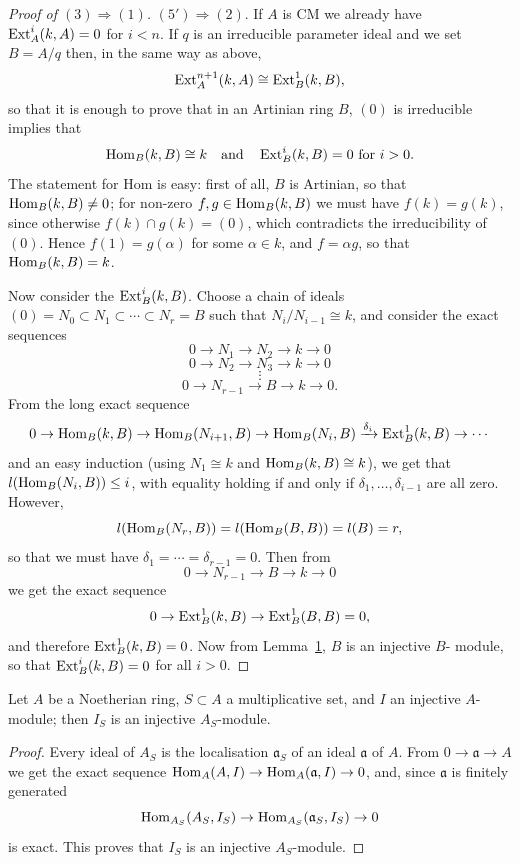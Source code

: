 \begin{proof}[Proof of $(3) \Rightarrow (1)$]
$(5') \Rightarrow (2)$. If $A$ is CM we already have $\operatorname{Ext}^i_A(k, A) = 0$ for $i < n$. If $q$ is
an irreducible parameter ideal and we set $B = A/q$ then, in the same way as
above,
\[
  \operatorname{Ext}^{n+1}_A(k, A) \cong \operatorname{Ext}^1_B(k, B),
\]
so that it is enough to prove that in an Artinian ring $B$, $(0)$ is irreducible
implies that
\[
  \operatorname{Hom}_B(k, B) \cong k \quad \text{and} \quad \operatorname{Ext}^i_B(k, B) = 0 \text{ for } i > 0.
\]
The statement for Hom is easy: first of all, $B$ is Artinian, so that
$\operatorname{Hom}_B(k, B) \neq 0$; for non-zero $f, g \in \operatorname{Hom}_B(k, B)$ we must have $f(k) = g(k)$,
since otherwise $f(k) \cap g(k) = (0)$, which contradicts the irreducibility of $(0)$.
Hence $f(1) = g(\alpha)$ for some $\alpha \in k$, and $f = \alpha g$, so that $\operatorname{Hom}_B(k, B) = k$.

Now consider the $\operatorname{Ext}^i_B(k, B)$. Choose a chain of ideals $(0) = N_0 \subset
N_1 \subset \cdots \subset N_r = B$ such that $N_i/N_{i-1} \cong k$, and consider the exact sequences
\[
  0 \to N_1 \to N_2 \to k \to 0
\]
\[
  0 \to N_2 \to N_3 \to k \to 0
\]
\[
  \vdots
\]
\[
  0 \to N_{r-1} \to B \to k \to 0.
\]
From the long exact sequence
\[
  0 \to \operatorname{Hom}_B(k, B) \to \operatorname{Hom}_B(N_{i+1}, B) \to \operatorname{Hom}_B(N_i, B) \xrightarrow{\delta_i}
  \operatorname{Ext}^1_B(k, B) \to \cdots
\]
and an easy induction (using $N_1 \cong k$ and $\operatorname{Hom}_B(k, B) \cong k$), we get that
$l(\operatorname{Hom}_B(N_i, B)) \le i$, with equality holding if and only if $\delta_1, \ldots, \delta_{i-1}$ are all
zero. However,
\[
  l(\operatorname{Hom}_B(N_r, B)) = l(\operatorname{Hom}_B(B, B)) = l(B) = r,
\]
so that we must have $\delta_1 = \cdots = \delta_{r-1} = 0$. Then from
\[
  0 \to N_{r-1} \to B \to k \to 0
\]
we get the exact sequence
\[
  0 \to \operatorname{Ext}^1_B(k, B) \to \operatorname{Ext}^1_B(B, B) = 0,
\]
and therefore $\operatorname{Ext}^1_B(k, B) = 0$. Now from Lemma~\hyperref[lem:18.1]{1}, $B$ is an injective $B$-
module, so that $\operatorname{Ext}^i_B(k, B) = 0$ for all $i > 0$.
\end{proof}

\begin{lemma}\label{lem:18.5}
Let $A$ be a Noetherian ring, $S \subset A$ a multiplicative set, and $I$ an
injective $A$-module; then $I_S$ is an injective $A_S$-module.
\end{lemma}

\begin{proof}
Every ideal of $A_S$ is the localisation $\mathfrak{a}_S$ of an ideal $\mathfrak{a}$ of $A$. From
$0 \to \mathfrak{a} \to A$ we get the exact sequence $\operatorname{Hom}_A(A, I) \to \operatorname{Hom}_A(\mathfrak{a}, I) \to 0$,
and, since $\mathfrak{a}$ is finitely generated
\[
  \operatorname{Hom}_{A_S}(A_S, I_S) \to \operatorname{Hom}_{A_S}(\mathfrak{a}_S, I_S) \to 0
\]
is exact. This proves that $I_S$ is an injective $A_S$-module.
\end{proof}

